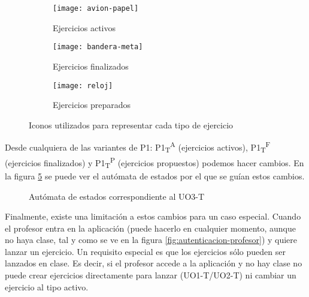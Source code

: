 \begin{figure}[!htbp]
\centering
\begin{subfigure}[t]{0.3\textwidth}
	\centering
	\texttt{[image: avion-papel]}
	\caption{Ejercicios activos}
	\label{fig:analisis-de-requisitos:funcionales:uo3t:iconos-1}
\end{subfigure}
%
\centering
\begin{subfigure}[t]{0.3\textwidth}
	\centering
	\texttt{[image: bandera-meta]}
	\caption{Ejercicios finalizados}
	\label{fig:analisis-de-requisitos:funcionales:uo3t:iconos-2}
\end{subfigure}
%
\centering
\begin{subfigure}[t]{0.3\textwidth}
	\centering
	\texttt{[image: reloj]}
	\caption{Ejercicios preparados}
	\label{fig:analisis-de-requisitos:funcionales:uo3t:iconos-3}
\end{subfigure}

\caption{Iconos utilizados para representar cada tipo de ejercicio}
\label{fig:analisis-de-requisitos:funcionales:uo3t:iconos}
\end{figure}

Desde cualquiera de las variantes de P1: P1\textsubscript{T}\textsuperscript{A} (ejercicios activos), P1\textsubscript{T}\textsuperscript{F} (ejercicios finalizados) y P1\textsubscript{T}\textsuperscript{P} (ejercicios propuestos) podemos hacer cambios. En la figura \ref{fig:analisis-de-requisitos:funcionales:uo3t:fsm} se puede ver el autómata de estados por el que se guían estos cambios.\\

\noindent
\begin{figure}[!htbp]
\noindent
{}
\caption{Autómata de estados correspondiente al UO3-T}
\label{fig:analisis-de-requisitos:funcionales:uo3t:fsm}
\end{figure}

Finalmente, existe una limitación a estos cambios para un caso especial. Cuando el profesor entra en la aplicación (puede hacerlo en cualquier momento, aunque no haya clase, tal y como se ve en la figura \ref{fig:autenticacion-profesor}) y quiere lanzar un ejercicio. Un requisito especial es que los ejercicios sólo pueden ser lanzados en clase. Es decir, si el profesor accede a la aplicación y no hay clase no puede crear ejercicios directamente para lanzar (UO1-T/UO2-T) ni cambiar un ejercicio al tipo activo.\\

